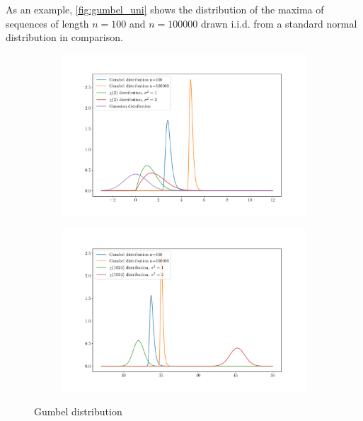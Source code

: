 As an example, \autoref{fig:gumbel_uni} shows the distribution of the maxima of
sequences of length $n = 100$ and $n = 100000$ drawn i.i.d. from a standard
normal distribution in comparison.
\begin{figure}[htpb]
    \centering

    \begin{subfigure}[]{0.48\textwidth}
        \centering
    \includegraphics[width=\linewidth]{figures/gumbel_multi_2.pdf}
    \caption{}
    \label{fig:gumbel_chi_2d}
    \end{subfigure}
    \begin{subfigure}[]{0.48\textwidth}
        \centering
    \includegraphics[width=\linewidth]{figures/gumbel_multi_1024.pdf}
    \caption{}
    \label{fig:gumbel_chi_1024d}
    \end{subfigure}

    \caption{Gumbel distribution}%
    \label{fig:gumbel_multi}
\end{figure}

